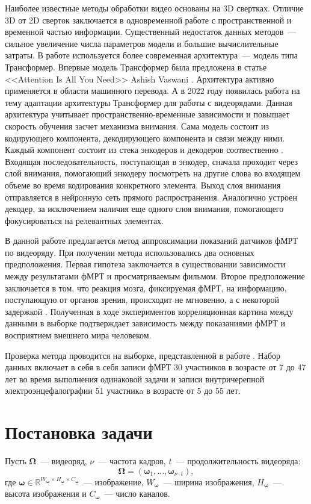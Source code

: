 \documentclass[12pt,twoside]{article}
\begin{document}
Наиболее известные методы обработки видео основаны на 3D свертках. 
Отличие 3D от 2D сверток заключается в одновременной работе с пространственной  
и временной частью информации. Существенный недостаток данных методов~--- 
сильное увеличение числа параметров модели и большие вычислительные затраты.
В работе используется более современная архитектура~--- модель типа Трансформер.
Впервые модель Трансформер была предложена в статье <<Attention Is All You Need>> Ashish Vaswani 
\citep{https://doi.org/10.48550/arxiv.1706.03762}. Архитектура активно применяется в области машинного перевода.
А в 2022 году появилась работа \citep{transformer} на тему адаптации архитектуры Трансформер для работы с видеорядами. 
Данная архитектура учитывает пространственно-временные зависимости и повышает скорость обучения засчет механизма внимания.
Сама модель состоит из кодирующего компонента, декодирующего компонента и связи между ними. Каждый компонент состоит из стека 
энкодеров и декодеров соотвественно \citep{badrinarayanan2017segnet}. 
Входящая последовательность, поступающая в энкодер, сначала проходит через слой внимания, помогающий энкодеру 
посмотреть на другие слова во входящем объеме во время кодирования конкретного элемента. 
Выход слоя внимания отправляется в нейронную сеть прямого распространения. 
Аналогично устроен декодер, за исключением наличия еще одного слоя внимания, помогающего фокусироваться на релевантных элементах.

В данной работе предлагается метод аппроксимации показаний датчиков фМРТ по видеоряду. 
При получении метода использовались два основных предположения. Первая гипотеза заключается в существовании зависимости между результатами фМРТ и просматриваемым фильмом.
Второе предположение заключается в том, что реакция мозга, фиксируемая фМРТ, на информацию, поступающую от органов зрения, происходит не мгновенно, а с некоторой задержкой \citep{Demidov}. 
Полученная в ходе экспериментов корреляционная картина между данными в выборке подтверждает 
зависимость между показаниями фМРТ и восприятием внешнего мира человеком. 

Проверка метода проводится на выборке, представленной в работе \citep{Berezutskaya2022}. 
Набор данных включает в себя в себя записи фМРТ 30 участников в возрасте от 7 до 47 лет во время 
выполнения одинаковой задачи и записи внутричерепной электроэнцефалографии 51 участникa в возрасте от 5 до 55 лет. 


\section{Постановка задачи}
Пусть $\bm{\Omega}$~--- видеоряд, $\nu$~--- частота кадров, $t$~--- продолжительность видеоряда:
\begin{equation}
    \bm{\Omega} = (\bm{\omega}_{1}, \dots, \bm{\omega}_{\nu \cdot t}),
\end{equation}
где $\bm{\omega} \in \mathbb{R}^{W_{\bm{\omega}} \times H_{\bm{\omega}} \times C_{\bm{\omega}}}$~--- изображение, $W_{\bm{\omega}}$~---
ширина изображения, $H_{\bm{\omega}}$~--- высота изображения и $C_{\bm{\omega}}$~--- число каналов.
\end{document}
